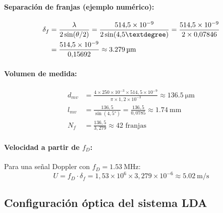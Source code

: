 \documentclass[12pt,a4paper]{article}
\begin{document}
\paragraph{Separación de franjas (ejemplo numérico):}
\begin{align}
	\delta_f & = \frac{\lambda}{2\sin(\theta/2)}
	= \frac{514{,}5\times10^{-9}}{2\sin(4{,}5°)}
	= \frac{514{,}5\times10^{-9}}{2\times0{,}07846}
	\notag                                              \\
	         & = \frac{514{,}5\times10^{-9}}{0{,}15692}
	\approx \SI{3,279}{\micro\metre}
	\label{eq:delta_f_num}
\end{align}

\paragraph{Volumen de medida:}
\begin{align}
	d_{mv} & = \frac{4\times 250\times10^{-3}\times 514{,}5\times10^{-9}}
	{\pi\times 1{,}2\times10^{-3}}
	\approx \SI{136,5}{\micro\metre}
	\label{eq:dmv_num}                                                    \\
	l_{mv} & = \frac{136{,}5}{\sin(4{,}5°)}
	= \frac{136{,}5}{0{,}0785}
	\approx \SI{1,74}{\mm}
	\label{eq:lmv_num}                                                    \\
	N_f    & = \frac{136{,}5}{3{,}279}
	\approx 42 \text{ franjas}
	\label{eq:Nf_num}
\end{align}

\paragraph{Velocidad a partir de $f_D$:}
Para una señal Doppler con $f_D = \SI{1,53}{\MHz}$:
\begin{equation}
	U = f_D \cdot \delta_f
	= 1{,}53\times10^6 \times 3{,}279\times10^{-6}
	\approx \SI{5,02}{\metre\per\second}
	\label{eq:U_num}
\end{equation}

\subsection{Configuración óptica del sistema LDA}
\label{subsec:config_optica}
\end{document}

